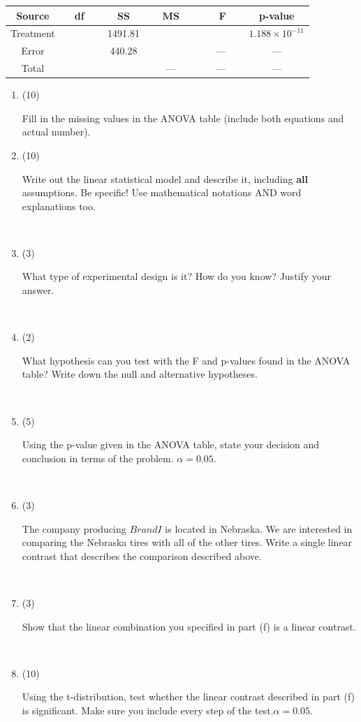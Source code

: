 \documentclass[12pt]{article}
\begin{document}
\begin{enumerate}
\begin{center}
\begin{tabular}{|c|c|c|c|c|c|}
\hline 
Source & \,\,\,\,\,\,df \,\,\,\,\,\,& SS & \,\,\,\,\,\,\,\,MS\,\,\,\,\,\,\,\, &\,\,\,\,\,\,\,\, F\,\,\,\,\,\,\,\, & p-value\\ \hline
Treatment &  & 1491.81 & & & $1.188\times 10^{-11}$\\ \hline
Error &&440.28&&---&---\\ \hline
Total &&&---&---&---\\ \hline
\end{tabular}
\end{center}
\begin{enumerate}
\item (10) \parbox[t]{6in}{Fill in the missing values in the ANOVA table (include both equations and actual number).}
\item (10) \parbox[t]{6in}{Write out the linear statistical model and describe it, including \textbf{all} assumptions. Be specific! Use mathematical notations AND word explanations too.}\\[2.8in]
\item (3) \parbox[t]{6in}{What type of experimental design is it? How do you know? Justify your answer.}\\[2.8in]
\item (2) \parbox[t]{6in}{What hypothesis can you test with the F and p-values found in the ANOVA table? Write down the null and alternative hypotheses.}\\[2.8in]
\item (5) \parbox[t]{6in}{Using the p-value given in the ANOVA table, state your decision and conclusion in terms of the problem. $\alpha=0.05$.} \\[2.8in]
\item (3) \parbox[t]{6in}{The company producing $Brand I$ is located in Nebraska. We are interested in comparing the Nebraska tires with all of the other tires. Write a single linear contrast that describes the comparison described above.} \\[1.8in]
\item (3) \parbox[t]{6in}{Show that the linear combination you specified in part (f) is a linear contrast.}\\[2.8in]
\item (10) \parbox[t]{6in}{Using the t-distribution, test whether the linear contrast described in part (f) is significant. Make sure you include every step of the test.$\alpha=0.05$.}\\[3.6in]

\end{enumerate}
\end{enumerate}
\end{document}
